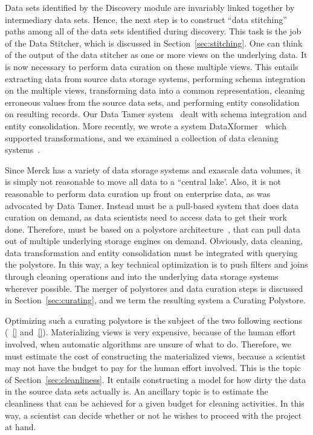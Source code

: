 Data sets identified by the Discovery module are invariably linked together by
intermediary data sets.  Hence, the next step is to construct ``data stitching''
paths among all of the data sets identified during discovery.  This task is the
job of the Data Stitcher, which is discussed in Section~\ref{sec:stitching}. One can think of the
output of the data stitcher as one or more views on the underlying data. It is
now necessary to perform data curation on these multiple views.  This entails
extracting data from source data storage systems, performing schema integration
on the multiple views, transforming data into a common representation, cleaning
erroneous values from the source data sets, and performing entity consolidation
on resulting records.  Our Data Tamer system~\cite{DBLP:conf/cidr/StonebrakerBIBCZPX13} dealt with schema integration
and entity consolidation.  More recently, we wrote a system DataXformer~\cite{DBLP:conf/icde/AbedjanMIOPS16}
which supported transformations, and we examined a collection of data cleaning systems~\cite{evaluatioin}.

Since Merck has a variety of data storage systems and exascale data volumes, it
is simply not reasonable to move all data to a  ``central lake'. Also, it is
not reasonable to perform data curation up front on enterprise data, as was
advocated by Data Tamer.  Instead \dcv  must be a pull-based system
that does data curation on demand, as data scientists need to access data to get
their work done.  Therefore, \dcv must be based on a polystore
architecture~\cite{DBLP:journals/sigmod/DugganESBHKMMMZ15}, that can pull data out of multiple underlying storage
engines on demand.  Obviously, data cleaning, data transformation and entity
consolidation must be integrated with querying the polystore.  In this way, a
key technical optimization is to push filters and joins through cleaning
operations and into the underlying data storage systems wherever possible.  The
merger of polystores and data curation steps is discussed in Section~\ref{sec:curating}, and we
term the resulting system a Curating Polystore.  

Optimizing such a curating polystore is the subject of the two following sections (~\ref{} and~\ref{}).
Materializing views is very expensive, because of the human effort involved,
when automatic algorithms are unsure of what to do.  Therefore, we must estimate
the cost of constructing the materialized views, because a scientist may not have the budget to
pay for the human effort involved.  This is the topic of Section~\ref{sec:cleanliness}.  It entails
constructing a model for how dirty the data in the source data sets actually is.
An ancillary topic is to estimate the cleanliness that can be achieved for a
given budget for cleaning activities.  In this way, a scientist can decide
whether or not he wishes to proceed with the project at hand.

